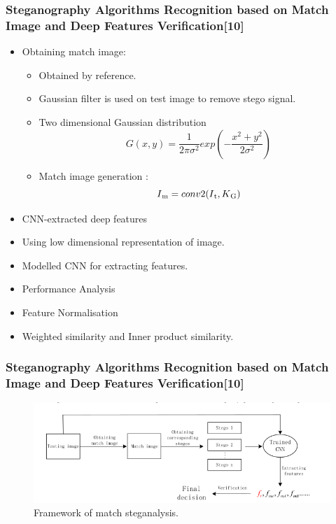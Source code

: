 \documentclass{beamer} %
\theoremstyle{definition} %
\begin{document}
\begin{frame}
\frametitle{Steganography Algorithms Recognition based on Match Image and Deep Features Verification[10] }
\begin{itemize}
	\item Obtaining	match image: 
		\begin{itemize}
			\item Obtained by reference.
			\item Gaussian filter is used on test image to remove stego signal.
			\item Two dimensional Gaussian distribution
			\begin{equation}
				G(x,y) = \frac{1}{2\pi\sigma^2} exp(-\frac{x^2+y^2}{2\sigma^2})
			\end{equation}
			\item Match image generation :
			\begin{equation}
				I\textsubscript{m}=conv2(I\textsubscript{t},K\textsubscript{G})
			\end{equation}
		\end{itemize}
			\item CNN-extracted deep features
			\item Using low dimensional representation of image.
			\item Modelled CNN for extracting features.
			\item Performance Analysis
			\item Feature Normalisation
			\item Weighted  similarity and Inner product similarity.
\end{itemize}
\end{frame}

\begin{frame}
\frametitle{Steganography Algorithms Recognition based on Match Image and Deep Features Verification[10] }
			\begin{figure}
				\includegraphics[scale=0.47]{matchstegFramework.png}
				\caption{Framework of match steganalysis.}
			\end{figure}
\end{frame}
\end{document}
